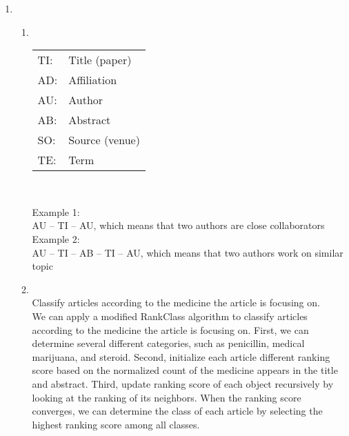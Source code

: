 \documentclass[10pt, a4paper]{article}
\begin{document}
\begin{enumerate}
\begin{enumerate}
    \end{enumerate}
\item\mbox{}
    \begin{enumerate}
    \item\mbox{}\\
        \begin{tabular}{ll}
            TI: & Title (paper)\\
            AD: & Affiliation\\
            AU: & Author\\
            AB: & Abstract\\
            SO: & Source (venue)\\
            TE: & Term\\
        \end{tabular}\\

        Example 1:\\
        AU -- TI -- AU, which means that two authors are close collaborators\\
        Example 2:\\
        AU -- TI -- AB -- TI -- AU, which means that two authors work on similar topic
    \item\mbox{}\\
        Classify articles according to the medicine the article is focusing on.\\
        We can apply a modified RankClass algorithm to classify articles according to the medicine the article is focusing on. First, we can determine several different categories, such as penicillin, medical marijuana, and steroid. Second, initialize each article different ranking score based on the normalized count of the medicine appears in the title and abstract. Third, update ranking score of each object recursively by looking at the ranking of its neighbors. When the ranking score converges, we can determine the class of each article by selecting the highest ranking score among all classes.\\
    \end{enumerate}


\end{enumerate}
\end{document}
